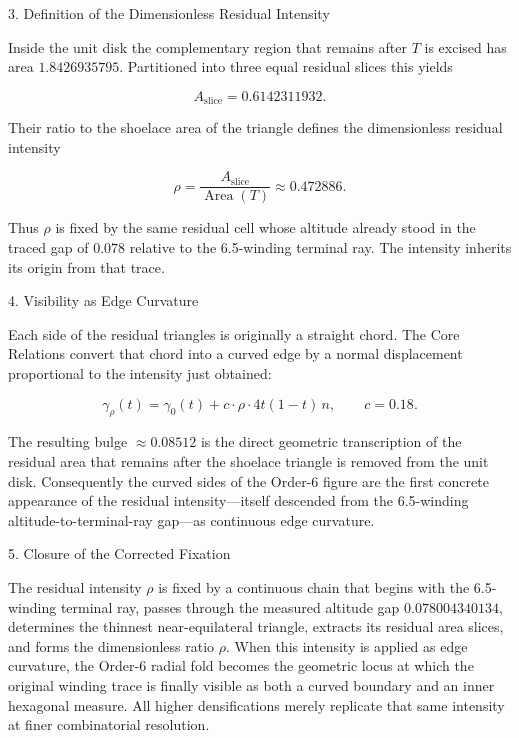 3. Definition of the Dimensionless Residual Intensity

Inside the unit disk the complementary region that remains after \(T\) is excised has area \(1.8426935795\). Partitioned into three equal residual slices this yields

\[
A_{\mathrm{slice}}=0.6142311932.
\]

Their ratio to the shoelace area of the triangle defines the dimensionless residual intensity

\[
\rho=\frac{A_{\mathrm{slice}}}{\operatorname{Area}(T)}\approx 0.472886.
\]

Thus \(\rho\) is fixed by the same residual cell whose altitude already stood in the traced gap of \(0.078\) relative to the 6.5-winding terminal ray. The intensity inherits its origin from that trace.

4. Visibility as Edge Curvature

Each side of the residual triangles is originally a straight chord. The Core Relations convert that chord into a curved edge by a normal displacement proportional to the intensity just obtained:

\[
\gamma_\rho(t)=\gamma_0(t)+c\cdot\rho\cdot 4t(1-t)\,n,\qquad c=0.18.
\]

The resulting bulge \(\approx 0.08512\) is the direct geometric transcription of the residual area that remains after the shoelace triangle is removed from the unit disk. Consequently the curved sides of the Order-6 figure are the first concrete appearance of the residual intensity—itself descended from the 6.5-winding altitude-to-terminal-ray gap—as continuous edge curvature.

5. Closure of the Corrected Fixation

The residual intensity \(\rho\) is fixed by a continuous chain that begins with the 6.5-winding terminal ray, passes through the measured altitude gap \(0.078004340134\), determines the thinnest near-equilateral triangle, extracts its residual area slices, and forms the dimensionless ratio \(\rho\). When this intensity is applied as edge curvature, the Order-6 radial fold becomes the geometric locus at which the original winding trace is finally visible as both a curved boundary and an inner hexagonal measure. All higher densifications merely replicate that same intensity at finer combinatorial resolution.
